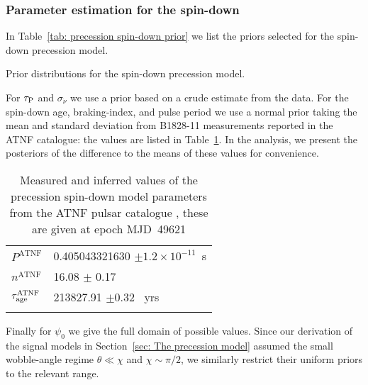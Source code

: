 \documentclass[../full_thesis/full_thesis.tex]{subfiles}
\newcommand{\thisdir}{../comparing_periodic_modulations}
\begin{document}
\subsubsection{Parameter estimation for the spin-down}

In Table~\ref{tab: precession spin-down prior} we list the priors selected for
the spin-down precession model.
\begin{table}
\centering
\caption{Prior distributions for the spin-down precession model.}
\label{tab: precession spin-down prior}

\end{table}
For $\tau_{\mathrm{P}}$ and
$\sigma_{\dot{\nu}}$ we use a prior based on a crude estimate from the data.
For the spin-down age, braking-index, and pulse period we use a normal prior
taking the mean and standard deviation from B1828-11 measurements reported in the
ATNF catalogue: the values are listed in Table~\ref{tab: ATNF}. In the analysis,
we present the posteriors of the difference to the means of these values for
convenience.
\begin{table}
\centering
\caption{Measured and inferred values of the precession spin-down model parameters
from the ATNF pulsar catalogue \citep{ATNF}, these are given at epoch MJD~49621}
\label{tab: ATNF}
\begin{tabular}{ll} \hline \rule{0pt}{3ex}
$P^{\mathrm{ATNF}}$ & 0.405043321630 $\pm 1.2\times10^{-11}$~s \\
$n^{\mathrm{ATNF}}$ & 16.08 $\pm$ 0.17 \\
$\tau_{\mathrm{age}}^{\mathrm{ATNF}}$ & 213827.91 $\pm 0.32$~ yrs\\
 \hhline{==}
\end{tabular}
\end{table}
Finally for $\psi_0$ we give the full domain of
possible values. Since our derivation of the signal models in Section~\ref{sec:
The precession model} assumed the small wobble-angle regime $\theta \ll \chi$
and $\chi \sim \pi/2$, we similarly restrict their uniform priors to the
relevant range.
\end{document}
